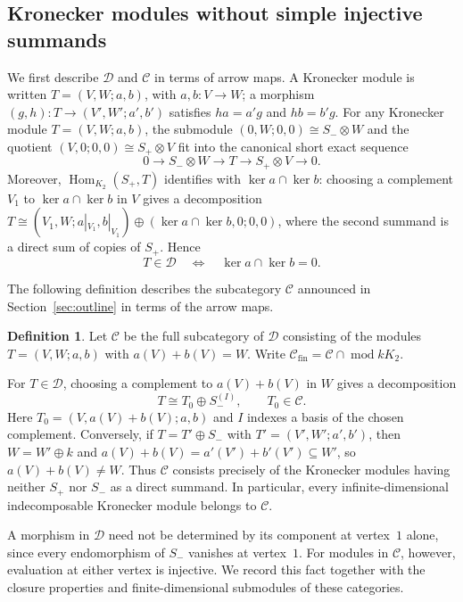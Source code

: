 \documentclass[a4paper,reqno,10pt]{amsart}
\theoremstyle{definition}
\newtheorem{definition}[theorem]{Definition}
\DeclareMathOperator{\Hom}{Hom}
\DeclareMathOperator{\md}{mod}
\newcommand{\D}{\mathcal D}
\newcommand{\C}{\mathcal C}
\numberwithin{equation}{section}
\begin{document}
\subsection{Kronecker modules without simple injective summands}
We first describe $\D$ and $\C$ in terms of arrow maps.
A Kronecker module is written $T=(V,W;a,b)$, with $a,b:V\to W$;
a morphism $(g,h):T\to(V',W';a',b')$ satisfies $ha=a'g$ and $hb=b'g$.
For any Kronecker module $T=(V,W;a,b)$, the submodule
$(0,W;0,0)\cong S_-\otimes W$ and the quotient $(V,0;0,0)\cong S_+\otimes V$
fit into the canonical short exact sequence
\begin{equation}\label{eq:canonical-sequence}
 0\longrightarrow S_-\otimes W\longrightarrow T
 \longrightarrow S_+\otimes V\longrightarrow0.
\end{equation}
Moreover, $\Hom_{K_2}(S_+,T)$ identifies with $\ker a\cap\ker b$:
choosing a complement $V_1$ to $\ker a\cap\ker b$ in $V$ gives a
decomposition $T\cong(V_1,W;a|_{V_1},b|_{V_1})\oplus(\ker a\cap\ker b,0;0,0)$,
where the second summand is a direct sum of copies of $S_+$. Hence
\begin{equation}\label{eq:domain}
 T\in\D\quad\Longleftrightarrow\quad\ker a\cap\ker b=0.
\end{equation}

The following definition describes the subcategory $\C$ announced in
Section~\ref{sec:outline} in terms of the arrow maps.
\begin{definition}\label{def:C}
Let $\C$ be the full subcategory of $\D$ consisting of the modules
$T=(V,W;a,b)$ with $a(V)+b(V)=W$. Write
$\C_{\mathrm{fin}}=\C\cap\md kK_2$.
\end{definition}
For $T\in\D$, choosing a complement to $a(V)+b(V)$ in $W$ gives a
decomposition
\begin{equation}\label{eq:simple-splitting}
 T\cong T_0\oplus S_-^{(I)},\qquad T_0\in\C.
\end{equation}
Here $T_0=(V,a(V)+b(V);a,b)$ and $I$ indexes a basis of the chosen complement.
Conversely, if $T=T'\oplus S_-$ with $T'=(V',W';a',b')$, then
$W=W'\oplus k$ and $a(V)+b(V)=a'(V')+b'(V')\subseteq W'$, so
$a(V)+b(V)\ne W$. Thus $\C$ consists precisely of the Kronecker modules
having neither $S_+$ nor $S_-$ as a direct summand. In particular, every infinite-dimensional indecomposable Kronecker
module belongs to $\C$.

A morphism in $\D$ need not be determined by its component at vertex~$1$ alone, since
every endomorphism of $S_-$ vanishes at vertex~$1$. For modules in $\C$, however,
evaluation at either vertex is injective. We record this fact together
with the closure properties and finite-dimensional submodules of these
categories.
\end{document}
